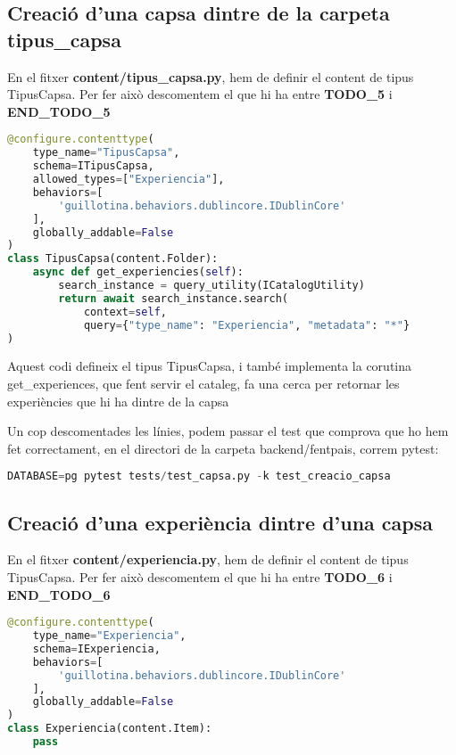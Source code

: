 \documentclass[a4paper, 11pt]{article}
\begin{document}
\subsection{Creació d'una capsa dintre de la carpeta tipus\_capsa}
En el fitxer \textbf{content/tipus\_capsa.py}, hem de definir el content de tipus
  TipusCapsa. Per fer això descomentem el que hi ha entre
  \textbf{TODO\_5} i \textbf{END\_TODO\_5}

\begin{lstlisting}[language=Python, caption=Definició content type TipusCapsa]
@configure.contenttype(
    type_name="TipusCapsa",
    schema=ITipusCapsa,
    allowed_types=["Experiencia"],
    behaviors=[
        'guillotina.behaviors.dublincore.IDublinCore'
    ],
    globally_addable=False
)
class TipusCapsa(content.Folder):
    async def get_experiencies(self):
        search_instance = query_utility(ICatalogUtility)
        return await search_instance.search(
            context=self,
            query={"type_name": "Experiencia", "metadata": "*"}
)
\end{lstlisting}

Aquest codi defineix el tipus TipusCapsa, i també implementa la
corutina get\_experiences, que fent servir el cataleg, fa una cerca per
retornar les experiències que hi ha dintre de la capsa

Un cop descomentades les línies, podem passar el test que comprova
  que ho hem fet correctament, en el directori de la carpeta
  backend/fentpais, correm pytest:
  \begin{lstlisting}[language=Python, caption=Testing 2]
    DATABASE=pg pytest tests/test_capsa.py -k test_creacio_capsa
  \end{lstlisting}

\subsection{Creació d'una experiència dintre d'una capsa}
En el fitxer \textbf{content/experiencia.py}, hem de definir el content de tipus
  TipusCapsa. Per fer això descomentem el que hi ha entre
  \textbf{TODO\_6} i \textbf{END\_TODO\_6}

\begin{lstlisting}[language=Python, caption=Definició content type Experiencia]
@configure.contenttype(
    type_name="Experiencia",
    schema=IExperiencia,
    behaviors=[
        'guillotina.behaviors.dublincore.IDublinCore'
    ],
    globally_addable=False
)
class Experiencia(content.Item):
    pass
\end{lstlisting}
\end{document}
